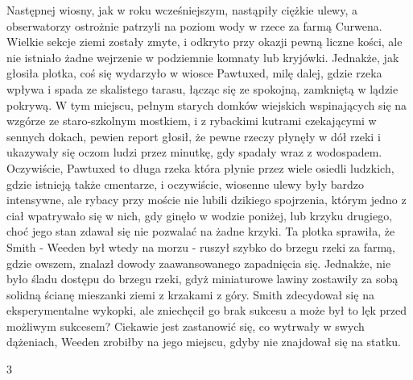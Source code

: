 Następnej wiosny, jak w roku wcześniejszym, nastąpiły ciężkie ulewy, a obserwatorzy ostrożnie patrzyli na poziom wody w rzece za farmą Curwena. Wielkie sekcje ziemi zostały zmyte, i odkryto przy okazji pewną liczne kości, ale nie istniało żadne wejrzenie w podziemnie komnaty lub kryjówki. Jednakże, jak głosiła plotka,  coś się wydarzyło w wiosce Pawtuxed, milę dalej, gdzie rzeka wpływa i spada ze skalistego tarasu, łącząc się ze spokojną, zamkniętą w lądzie pokrywą. W tym miejscu, pełnym starych domków wiejskich wspinających się na wzgórze ze staro-szkolnym mostkiem, i z rybackimi kutrami czekającymi w sennych dokach, pewien report głosił, że pewne rzeczy płynęły w dół rzeki i ukazywały się oczom ludzi przez minutkę, gdy spadały wraz z wodospadem. Oczywiście, Pawtuxed to długa rzeka która płynie przez wiele osiedli ludzkich, gdzie istnieją także cmentarze, i oczywiście, wiosenne ulewy były bardzo intensywne, ale rybacy przy moście nie lubili dzikiego spojrzenia, którym jedno z ciał wpatrywało się w nich, gdy ginęło w wodzie poniżej, lub krzyku drugiego, choć jego stan zdawał się nie pozwalać na żadne krzyki. Ta plotka sprawiła, że Smith - Weeden był wtedy na morzu - ruszył szybko do brzegu rzeki za farmą, gdzie owszem, znalazł dowody zaawansowanego zapadnięcia się. Jednakże, nie było śladu dostępu do brzegu rzeki, gdyż miniaturowe lawiny zostawiły za sobą solidną ścianę mieszanki ziemi z krzakami z góry. Smith zdecydował się na eksperymentalne wykopki, ale zniechęcił go brak sukcesu a może był to lęk przed możliwym sukcesem? Ciekawie jest zastanowić się, co wytrwały w swych dążeniach, Weeden zrobiłby na jego miejscu, gdyby nie znajdował się na statku.

\begin{center}
3
\end{center}


